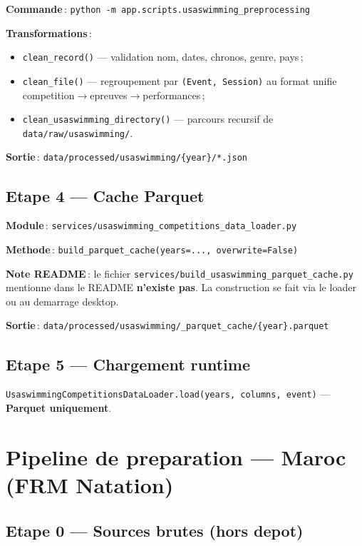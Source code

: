 \documentclass[11pt,a4paper]{article}
\begin{document}
\textbf{Commande}\,: \texttt{python -m app.scripts.usaswimming\_preprocessing}

\textbf{Transformations}\,:
\begin{itemize}
  \item \texttt{clean\_record()} --- validation nom, dates, chronos, genre, pays\,;
  \item \texttt{clean\_file()} --- regroupement par \texttt{(Event, Session)} au format unifie competition$\rightarrow$epreuves$\rightarrow$performances\,;
  \item \texttt{clean\_usaswimming\_directory()} --- parcours recursif de \texttt{data/raw/usaswimming/}.
\end{itemize}

\textbf{Sortie}\,: \texttt{data/processed/usaswimming/\{year\}/*.json}

\subsection{Etape 4 --- Cache Parquet}

\textbf{Module}\,: \texttt{services/usaswimming\_competitions\_data\_loader.py}

\textbf{Methode}\,: \texttt{build\_parquet\_cache(years=..., overwrite=False)}

\textbf{Note README}\,: le fichier \texttt{services/build\_usaswimming\_parquet\_cache.py} mentionne dans le README \textbf{n'existe pas}. La construction se fait via le loader ou au demarrage desktop.

\textbf{Sortie}\,: \texttt{data/processed/usaswimming/\_parquet\_cache/\{year\}.parquet}

\subsection{Etape 5 --- Chargement runtime}

\texttt{UsaswimmingCompetitionsDataLoader.load(years, columns, event)} --- \textbf{Parquet uniquement}.

\section{Pipeline de preparation --- Maroc (FRM Natation)}

\subsection{Etape 0 --- Sources brutes (hors depot)}
\end{document}

